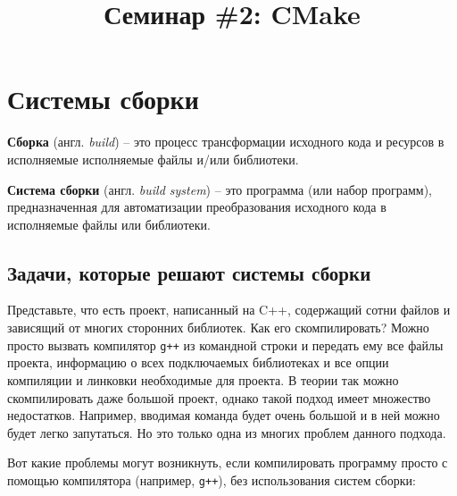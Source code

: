 \documentclass{article}
\begin{document}
\title{Семинар \#2: CMake \vspace{-5ex}}\date{}\maketitle

\section{Системы сборки}
\begin{description}
\item \textbf{Сборка} (англ. \textit{build}) -- это процесс трансформации исходного кода и ресурсов в исполняемые исполняемые файлы и/или библиотеки.

\item \textbf{Система сборки} (англ. \textit{build system}) -- это программа (или набор программ), предназначенная для автоматизации преобразования исходного кода в исполняемые файлы или библиотеки. 
\end{description}



\subsection*{Задачи, которые решают системы сборки}
Представьте, что есть проект, написанный на C++, содержащий сотни файлов и зависящий от многих сторонних библиотек. Как его скомпилировать? Можно просто вызвать компилятор \texttt{g++} из командной строки и передать ему все файлы проекта, информацию о всех подключаемых библиотеках и все опции компиляции и линковки необходимые для проекта. В теории так можно скомпилировать даже большой проект, однако такой подход имеет множество недостатков. Например, вводимая команда будет очень большой и в ней можно будет легко  запутаться. Но это только одна из многих проблем данного подхода. 


Вот какие проблемы могут возникнуть, если компилировать программу просто с помощью компилятора (например, \texttt{g++}), без использования систем сборки:
\end{document}
